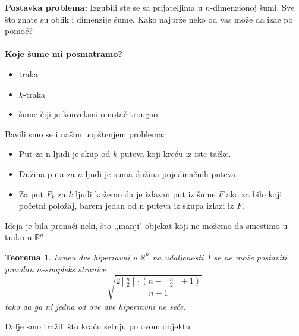 \documentclass[b1paper,portrait]{template/baposter}
\newtheorem{theorem}{Teorema}
\begin{document}
\begin{poster}
{ 
	\textbf{Postavka problema:}
 	Izgubili ste se sa prijateljima u $n$-dimenzionoj \v sumi.
 	Sve \v sto znate su oblik i dimenzije \v sume.
 	Kako najbr\v ze neko od vas mo\v ze da iza\dj e po pomo\' c?
 	\\
 	\\
 	\textbf{Koje \v sume mi posmatramo?}
 	\begin{itemize}
 		\item traka
 		\item $k$-traka
 		\item \v sume \v ciji je konveksni omota\v c trougao
 	\end{itemize}
 	{
	}
   	\vspace{0.15cm}
}
{
	Bavili smo se i na\v sim uop\v stenjem problema:
	\begin{itemize}
		\item Put za n ljudi je skup od $k$ puteva koji kre\' cu iz iste ta\v cke.
		\item Du\v zina puta za $n$ ljudi je suma du\v zina pojedina\v cnih puteva.
		\item Za put $P_k$ za $k$ ljudi ka\v zemo da je izlazan put iz \v sume $F$ ako za bilo koji po\v cetni polo\v zaj, barem jedan od n puteva iz skupa izlazi iz $F$.
	\end{itemize}
	\vspace{0.15cm}
}



{
 	Ideja je bila  prona\' ci neki, \v sto ,,manji" objekat koji ne mo\v zemo da smestimo u traku u $\mathbb{R}^n$
 	\begin{theorem}
 		Izme\dj u dve hiperravni u $\mathbb{R}^n$ na udaljenosti 1 se ne mo\v ze postaviti pravilan $n$-simpleks stranice
 		$$\sqrt{\frac{2\left\lceil \frac{n}{2}\right\rceil\cdot \left( n-\left\lceil\frac{n}{2}\right\rceil+1\right)}{n+1}}$$
 		tako da ga ni jedna od ove dve hiperravni ne se\v ce. 
 	\end{theorem}
 	Dalje smo tra\v zili \v sto kra\v cu \' setnju po ovom objektu

}
\end{poster}
\end{document}
